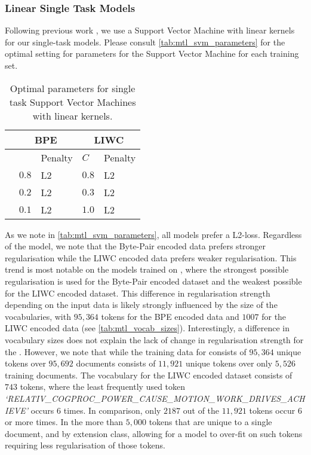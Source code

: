\subsubsection{Linear Single Task Models}

Following previous work \cite{Waseem:2016,Davidson:2017}, we use a Support Vector Machine with linear kernels for our single-task models. Please consult \autoref{tab:mtl_svm_parameters} for the optimal setting for parameters for the Support Vector Machine for each training set.

\begin{table}[]
\centering
\begin{tabular}{l|ll|ll}
                     & \multicolumn{2}{c}{BPE} & \multicolumn{2}{c}{LIWC} \\ \hline
                     &         & Penalty       & $C$      & Penalty       \\ \hline
\cite{Waseem:2016}   & $0.8$   & L2            & $0.8$    & L2            \\
\cite{Davidson:2017} & $0.2$   & L2            & $0.3$    & L2            \\
\cite{Wulczyn:2016}  & $0.1$   & L2            & $1.0$    & L2
\end{tabular}
\caption{Optimal parameters for single task Support Vector Machines with linear kernels.}
\label{tab:mtl_svm_parameters}
\end{table}

As we note in \autoref{tab:mtl_svm_parameters}, all models prefer a L2-loss. Regardless of the model, we note that the Byte-Pair encoded data prefers stronger regularisation while the LIWC encoded data prefers weaker regularisation. This trend is most notable on the models trained on \citet{Wulczyn:2016}, where the strongest possible regularisation is used for the Byte-Pair encoded dataset and the weakest possible for the LIWC encoded dataset. This difference in regularisation strength depending on the input data is likely strongly influenced by the size of the vocabularies, with $95,364$ tokens for the BPE encoded data and $1007$ for the LIWC encoded data (see \autoref{tab:mtl_vocab_sizes}). Interestingly, a difference in vocabulary sizes does not explain the lack of change in regularisation strength for the \citet{Waseem:2016}. However, we note that while the training data for \citet{Wulczyn:2016} consists of $95,364$ unique tokens over $95,692$ documents \citet{Waseem:2016} consists of $11,921$ unique tokens over only $5,526$ training documents. The vocabulary for the LIWC encoded \citet{Waseem:2016} dataset consists of $743$ tokens, where the least frequently used token \textit{`RELATIV\_COGPROC\_POWER\_CAUSE\_MOTION\_WORK\_DRIVES\_ACHIEVE'} occurs $6$ times. In comparison, only $2187$ out of the $11,921$ tokens occur $6$ or more times. In the more than $5,000$ tokens that are unique to a single document, and by extension class, allowing for a model to over-fit on such tokens requiring less regularisation of those tokens.

